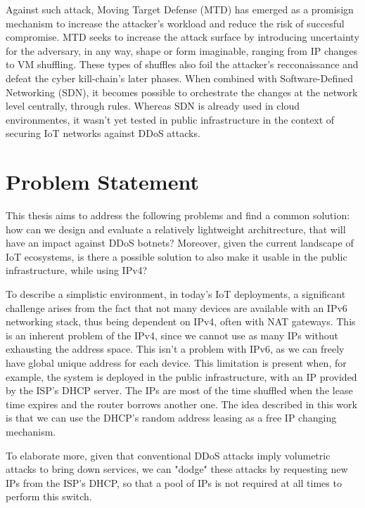 Against such attack, Moving Target Defense (MTD) has emerged as a promisign mechanism \cite{mtd_vol1}\cite{jafarian2014}\cite{macfarland2015} to increase the attacker's workload and reduce the risk of succesful compromise. MTD seeks to increase the attack surface by introducing uncertainty for the adversary, in any way, shape or form imaginable, ranging from IP changes to VM shuffling. These types of shuffles also foil the attacker's recconaissance and defeat the cyber kill-chain's\cite{lockheed_killchain} later phases. When combined with Software-Defined Networking (SDN), it becomes possible to orchestrate the changes at the network level centrally, through rules. Whereas SDN is already used in cloud environmentes, it wasn't yet tested in public infrastructure in the context of securing IoT networks against DDoS attacks.

\section{Problem Statement}
This thesis aims to address the following problems and find a common solution: how can we design and evaluate a relatively lightweight architrecture, that will have an impact against DDoS botnets? Moreover, given the current landscape of IoT ecosystems, is there a possible solution to also make it usable in the public infrastructure, while using IPv4?

To describe a simplistic environment, in today's IoT deployments, a significant challenge arises from the fact that not many devices are available with an IPv6 networking stack, thus being dependent on IPv4, often with NAT gateways. This is an inherent problem of the IPv4, since we cannot use as many IPs without exhausting the address space. This isn't a problem with IPv6, as we can freely have global unique address for each device.
This limitation is present when, for example, the system is deployed in the public infrastructure, with an IP provided by the ISP's DHCP server. The IPs are most of the time shuffled when the lease time expires and the router borrows another one. The idea described in this work is that we can use the DHCP's random address leasing as a free IP changing mechanism.

To elaborate more, given that conventional DDoS attacks imply volumetric attacks to bring down services, we can "dodge" these attacks by requesting new IPs from the ISP's DHCP, so that a pool of IPs is not required at all times to perform this switch.
        
